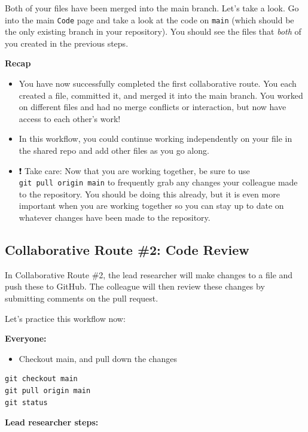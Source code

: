 \documentclass[
]{book}
\providecommand{\tightlist}{%
  \setlength{\itemsep}{0pt}\setlength{\parskip}{0pt}}
\begin{document}
Both of your files have been merged into the main branch. Let's take a look. Go
into the main \texttt{Code} page and take a look at the code on \texttt{main} (which should be
the only existing branch in your repository). You should see the files that
\emph{both} of you created in the previous steps.

\textbf{Recap}

\begin{itemize}
\item
  You have now successfully completed the first collaborative route. You each
  created a file, committed it, and merged it into the main branch. You worked on
  different files and had no merge conflicts or interaction, but now have access
  to each other's work!
\item
  In this workflow, you could continue working independently on your file in
  the shared repo and add other files as you go along.
\item
  ❗ Take care: Now that you are working together, be sure
  to use \texttt{git\ pull\ origin\ main} to frequently grab any changes your colleague made to the
  repository. You should be doing this already, but it is even more important
  when you are working together so you can stay up to date on whatever changes
  have been made to the repository.
\end{itemize}

\subsection{Collaborative Route \#2: Code Review}\label{collaborative-route-2-code-review}

In Collaborative Route \#2, the lead researcher will make
changes to a file and push these to GitHub. The colleague will then review
these changes by submitting comments on the pull request.

Let's practice this workflow now:

\textbf{Everyone:}

\begin{itemize}
\tightlist
\item
  Checkout main, and pull down the changes
\end{itemize}

\begin{verbatim}
git checkout main
git pull origin main
git status
\end{verbatim}

\textbf{Lead researcher steps:}
\end{document}

